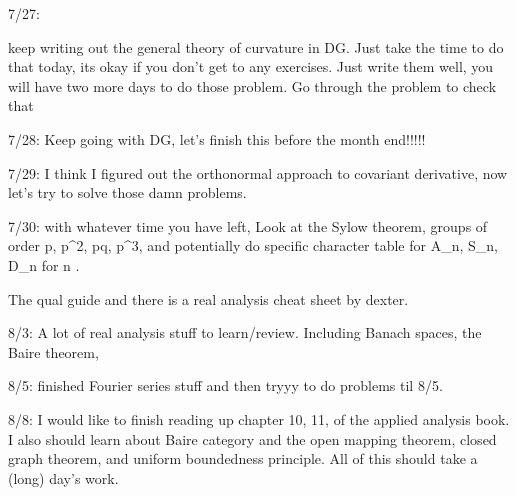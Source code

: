 7/27:

keep writing out the general theory of curvature in DG. Just take the time to do that today, its okay if you don't get to any exercises. Just write them well, you will have two more days to do those problem. Go through the problem to check that 


7/28: Keep going with DG, let's finish this before the month end!!!!!

7/29: I think I figured out the orthonormal approach to covariant derivative, now let's try to solve those damn problems.



7/30: with whatever time you have left, Look at the Sylow theorem, groups of order p, p^2, pq, p^3, and potentially do specific character table for A_n, S_n, D_n for n . 



The qual guide and there is a real analysis cheat sheet by dexter. 

8/3: A lot of real analysis stuff to learn/review. Including Banach spaces, the Baire theorem, 



8/5: finished Fourier series stuff and then tryyy to do problems til 8/5.


8/8: I would like to finish reading up chapter 10, 11, of the applied analysis book. I also should learn about Baire category and the open mapping theorem, closed graph theorem, and uniform boundedness principle. All of this should take a (long) day's work.